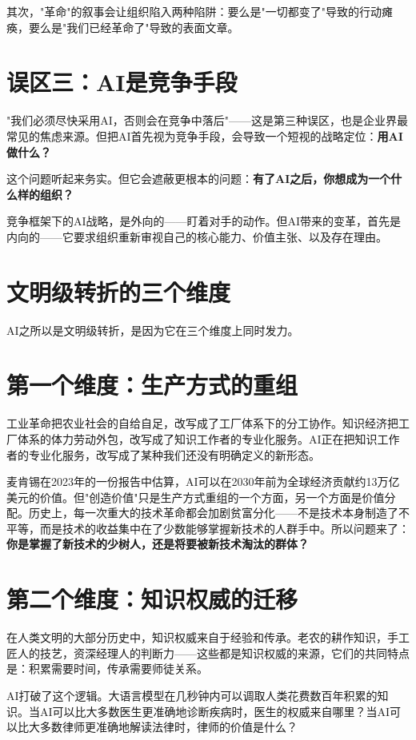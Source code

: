 其次，"革命"的叙事会让组织陷入两种陷阱：要么是"一切都变了"导致的行动瘫痪，要么是"我们已经革命了"导致的表面文章。

\section{误区三：AI是竞争手段}


"我们必须尽快采用AI，否则会在竞争中落后"——这是第三种误区，也是企业界最常见的焦虑来源。但把AI首先视为竞争手段，会导致一个短视的战略定位：\textbf{用AI做什么？}

这个问题听起来务实。但它会遮蔽更根本的问题：\textbf{有了AI之后，你想成为一个什么样的组织？}

竞争框架下的AI战略，是外向的——盯着对手的动作。但AI带来的变革，首先是内向的——它要求组织重新审视自己的核心能力、价值主张、以及存在理由。


\section{文明级转折的三个维度}


AI之所以是文明级转折，是因为它在三个维度上同时发力。

\section{第一个维度：生产方式的重组}


工业革命把农业社会的自给自足，改写成了工厂体系下的分工协作。知识经济把工厂体系的体力劳动外包，改写成了知识工作者的专业化服务。AI正在把知识工作者的专业化服务，改写成了某种我们还没有明确定义的新形态。

麦肯锡在2023年的一份报告中估算，AI可以在2030年前为全球经济贡献约13万亿美元的价值。但"创造价值"只是生产方式重组的一个方面，另一个方面是价值分配。历史上，每一次重大的技术革命都会加剧贫富分化——不是技术本身制造了不平等，而是技术的收益集中在了少数能够掌握新技术的人群手中。所以问题来了： \textbf{你是掌握了新技术的少树人，还是将要被新技术淘汰的群体？}

\section{第二个维度：知识权威的迁移}


在人类文明的大部分历史中，知识权威来自于经验和传承。老农的耕作知识，手工匠人的技艺，资深经理人的判断力——这些都是知识权威的来源，它们的共同特点是：积累需要时间，传承需要师徒关系。

AI打破了这个逻辑。大语言模型在几秒钟内可以调取人类花费数百年积累的知识。当AI可以比大多数医生更准确地诊断疾病时，医生的权威来自哪里？当AI可以比大多数律师更准确地解读法律时，律师的价值是什么？

